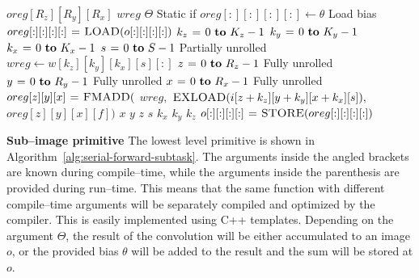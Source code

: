   \begin{algorithm}
    {\footnotesize
      \begin{codebox}
        \li {} $oreg[R_z][R_y][R_x]$
        \li {} $wreg$
        \li \If $\Theta$ \Comment Static if
        \li \Then $oreg[:][:][:][:] \gets \theta$ \Comment Load bias
        \li \Else
        \li       $oreg[:][:][:][:] \mathrel{\hspace{1pt}=\hspace{1pt}} \textnormal{\scshape LOAD}(o[:][:][:][:])$
        \End \li {}
        \li {} $k_z \gets 0 \To K_z-1$
        \li   \Do {} $k_y \gets 0 \To K_y-1$
        \li      \Do {} $k_x \gets 0 \To K_x-1$
        \li         \Do {} $s \gets 0 \To S - 1$ \Comment Partially unrolled
        \li         \Do $wreg \gets w[k_z][k_y][k_x][s][:]$
        \li {} $z \gets 0 \To R_z-1$ \Comment Fully unrolled
        \li   \Do {} $y \gets 0 \To R_y-1$ \Comment Fully unrolled
        \li      \Do {} $x \gets 0 \To R_x-1$ \Comment Fully unrolled
        \li         \Do $oreg[z][y][x] \mathrel{\hspace{1pt}=\hspace{1pt}} \textnormal{\scshape FMADD}($
        \li       $wreg,$
        \li       $\textnormal{\scshape EXLOAD}(i[z+k_z][y+k_y][x+k_x][s]),$
        \li       $oreg[z][y][x][f])$
        \End \li {} $x$
        \End \li {} $y$
        \End \li {} $z$
        \End \li {} $s$
        \End \li {} $k_x$
        \End \li {} $k_y$
        \End \li {} $k_z$
        \li $o[:][:][:][:] \mathrel{\hspace{1pt}=\hspace{1pt}} \textnormal{\scshape STORE}(oreg[:][:][:][:])$
      \end{codebox}
    \caption{The finest granularity primitive that computes a
      sub--image of size $R_z \times R_y \times R_x$ of $S$ images by
      performing $S^2$ convolutions on $S$ input images with a kernel
      of size $K_z \times K_y \times K_x$.}
    \label{alg:serial-forward-subtask}
    }
  \end{algorithm}

  {\bf Sub--image primitive} \quad The lowest level primitive is shown
  in Algorithm~\ref{alg:serial-forward-subtask}.  The arguments inside
  the angled brackets are known during compile--time, while the
  arguments inside the parenthesis are provided during run--time.
  This means that the same function with different compile--time
  arguments will be separately compiled and optimized by the compiler.
  This is easily implemented using C++ templates.  Depending on the
  argument $\Theta$, the result of the convolution will be either
  accumulated to an image $o$, or the provided bias $\theta$ will be
  added to the result and the sum will be stored at $o$.

